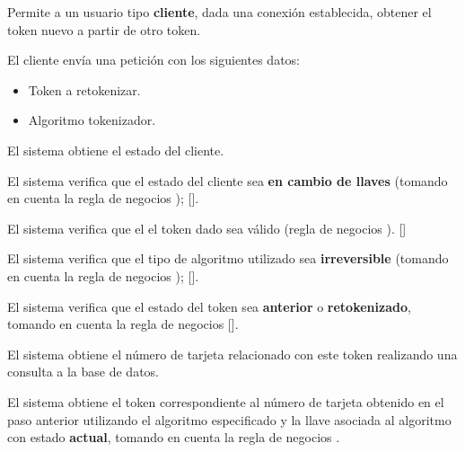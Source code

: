%
%

{
  Permite a un usuario tipo \textbf{cliente}, dada una conexión establecida,
  obtener el token nuevo a partir de otro token.

  \begin{trayectoriaPrincipal}

    \item El cliente envía una petición con los siguientes datos:
      \begin{itemize}
        \item Token a retokenizar.
        \item Algoritmo tokenizador.
      \end{itemize}

    \item El sistema obtiene el estado del cliente.

    \item El sistema verifica que el estado del cliente sea
      \textbf{en cambio de llaves} (tomando en cuenta la regla de negocios
      );
      [].

    \item El sistema verifica que el el token dado sea válido (regla de
      negocios ).
      []

    \item El sistema verifica que el tipo de algoritmo utilizado sea
      \textbf{irreversible} (tomando en cuenta la regla de negocios
      );
      [].

    \item El sistema verifica que el estado del token sea \textbf{anterior}
      o \textbf{retokenizado}, tomando en cuenta la regla de negocios
       [].

    \item El sistema obtiene el número de tarjeta relacionado con este token
      realizando una consulta a la base de datos.

    \item El sistema obtiene el token correspondiente al número de tarjeta
      obtenido en el paso anterior utilizando el algoritmo especificado y la
      llave asociada al algoritmo con estado \textbf{actual}, tomando en cuenta
      la regla de negocios .


\end{trayectoriaPrincipal}}
